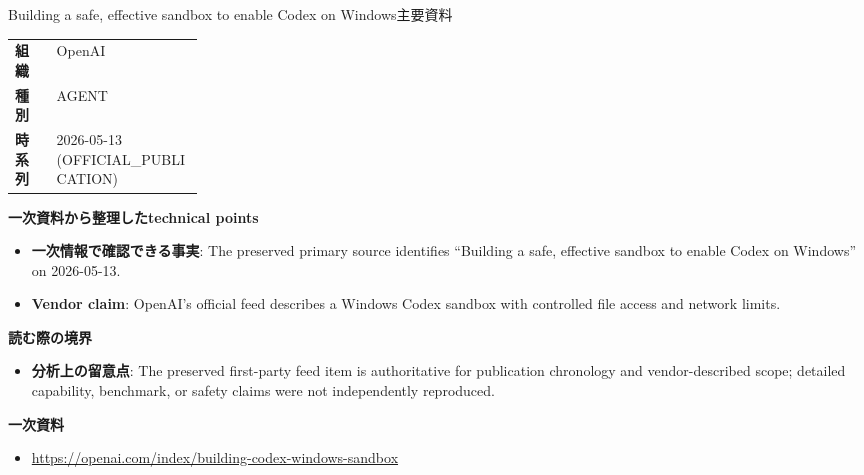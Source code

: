 \begin{technicalnote}{Building a safe, effective sandbox to enable Codex on Windows}{主要資料}
\begin{tabularx}{\linewidth}{@{}>{\bfseries}p{0.22\linewidth}X@{}}
組織 & OpenAI \\
種別 & AGENT \\
時系列 & 2026-05-13 (OFFICIAL\_PUBLICATION) \\
\end{tabularx}
\smallskip
{\bfseries 一次資料から整理したtechnical points}
\begin{itemize}[leftmargin=1.5em,itemsep=0.35em]
\item \textbf{一次情報で確認できる事実}: The preserved primary source identifies “Building a safe, effective sandbox to enable Codex on Windows” on 2026-05-13.
\item \textbf{Vendor claim}: OpenAI's official feed describes a Windows Codex sandbox with controlled file access and network limits.
\end{itemize}
{\bfseries 読む際の境界}
\begin{itemize}[leftmargin=1.5em,itemsep=0.35em]
\item \textbf{分析上の留意点}: The preserved first-party feed item is authoritative for publication chronology and vendor-described scope; detailed capability, benchmark, or safety claims were not independently reproduced.
\end{itemize}
{\bfseries 一次資料}
\begingroup\sloppy
\begin{itemize}[leftmargin=1.5em,itemsep=0.25em]
\item {\scriptsize\url{https://openai.com/index/building-codex-windows-sandbox}}
\end{itemize}
\endgroup
\end{technicalnote}
\medskip

